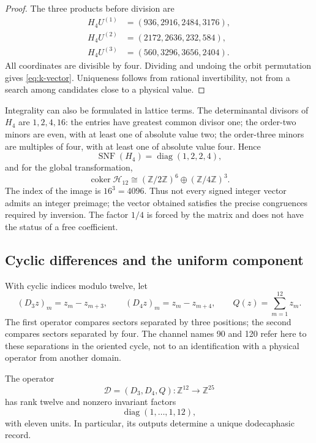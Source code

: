 \begin{proof}
The three products before division are
\begin{align*}
 H_4U^{(1)}&=(936,2916,2484,3176),\\
 H_4U^{(2)}&=(2172,2636,232,584),\\
 H_4U^{(3)}&=(560,3296,3656,2404).
\end{align*}
All coordinates are divisible by four. Dividing and undoing the
orbit permutation gives \eqref{eq:k-vector}. Uniqueness follows from
rational invertibility, not from a search among candidates close to
a physical value.
\end{proof}

Integrality can also be formulated in lattice terms. The
determinantal divisors of \(H_4\) are \(1,2,4,16\): the entries
have greatest common divisor one; the order-two minors are even, with
at least one of absolute value two; the order-three minors are multiples of four, with
at least one of absolute value four. Hence
\[
 \operatorname{SNF}(H_4)=\operatorname{diag}(1,2,2,4),
\]
and for the global transformation,
\[
 \operatorname{coker}\mathcal H_{12}
 \cong(\mathbb Z/2\mathbb Z)^6\oplus(\mathbb Z/4\mathbb Z)^3.
\]
The index of the image is \(16^3=4096\). Thus not every signed
integer vector admits an integer preimage; the vector obtained satisfies the
precise congruences required by inversion. The factor \(1/4\) is
forced by the matrix and does not have the status of a free coefficient.

\subsection{Cyclic differences and the uniform component}
\label{subsec:k-transversal}

With cyclic indices modulo twelve, let
\[
 (D_3z)_m=z_m-z_{m+3},\qquad(D_4z)_m=z_m-z_{m+4},
 \qquad Q(z)=\sum_{m=1}^{12}z_m.
\]
The first operator compares sectors separated by three positions; the
second compares sectors separated by four. The channel names 90 and 120 refer here to
these separations in the oriented cycle, not to an identification with a
physical operator from another domain.

\begin{proposition}
\label{prop:k-transversal}
The operator
\[
 \mathcal D=(D_3,D_4,Q):\mathbb Z^{12}\longrightarrow\mathbb Z^{25}
\]
has rank twelve and nonzero invariant factors
\[
 \operatorname{diag}(1,\ldots,1,12),
\]
with eleven units. In particular, its outputs determine a unique dodecaphasic record.
\end{proposition}

